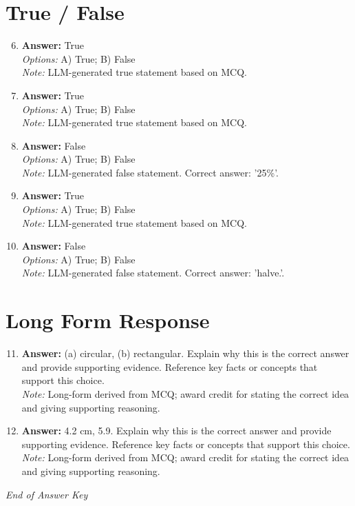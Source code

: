 \documentclass[12pt]{article}
\begin{document}
\section*{True / False}
\begin{enumerate}[label=\arabic*.]
\setcounter{enumi}{5}
\item \textbf{Answer:} True
\\ \textit{Options:} A) True; B) False
\\ \textit{Note:} LLM-generated true statement based on MCQ.
\item \textbf{Answer:} True
\\ \textit{Options:} A) True; B) False
\\ \textit{Note:} LLM-generated true statement based on MCQ.
\item \textbf{Answer:} False
\\ \textit{Options:} A) True; B) False
\\ \textit{Note:} LLM-generated false statement. Correct answer: '25\%'.
\item \textbf{Answer:} True
\\ \textit{Options:} A) True; B) False
\\ \textit{Note:} LLM-generated true statement based on MCQ.
\item \textbf{Answer:} False
\\ \textit{Options:} A) True; B) False
\\ \textit{Note:} LLM-generated false statement. Correct answer: 'halve.'.
\end{enumerate}

\section*{Long Form Response}
\begin{enumerate}[label=\arabic*.]
\setcounter{enumi}{10}
\item \textbf{Answer:} (a) circular, (b) rectangular. Explain why this is the correct answer and provide supporting evidence. Reference key facts or concepts that support this choice.
\\ \textit{Note:} Long-form derived from MCQ; award credit for stating the correct idea and giving supporting reasoning.
\item \textbf{Answer:} 4.2 cm, 5.9. Explain why this is the correct answer and provide supporting evidence. Reference key facts or concepts that support this choice.
\\ \textit{Note:} Long-form derived from MCQ; award credit for stating the correct idea and giving supporting reasoning.
\end{enumerate}

\vfill
\noindent\textit{End of Answer Key}
\end{document}
